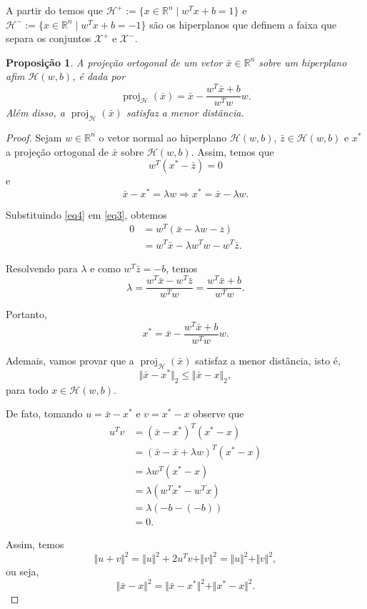 \documentclass[12pt,a4paper]{scrartcl}
\DeclareMathOperator{\proj}{proj}
\def\Xset{\mathcal{X}}
\def\Hset{\mathcal{H}}
\def\RR{\mathds{R}}
\def\xbar{\bar{x}}
\newtheorem{prop}{Proposição}
\theoremstyle{definition}%
\begin{document}
A partir do  temos que $\Hset^{+}:=\{x\in \RR^n \mid w^{T}x+b= 1\}$ e $\Hset^{-}:=\{x\in \RR^n \mid w^{T}x+b= -1\}$ são os hiperplanos que definem a faixa que separa os conjuntos $\Xset^{+}$ e $\Xset^{-}$.

\begin{prop} \label{prop1} A projeção ortogonal de um vetor $\xbar\in \RR^n$ sobre um hiperplano afim $\Hset(w,b)$, é dada por
\[ \proj_{\Hset}(\xbar)= \xbar - \dfrac{w^{T}\xbar+b}{w^{T}w}w. \]
Além disso, a $\proj_{\Hset}(\xbar)$ satisfaz a menor distância.
\end{prop}

\begin{proof}
Sejam $w\in \RR^n$ o vetor normal ao hiperplano $\Hset(w,b)$, $\bar{z}\in \Hset(w,b)$ e $x^{*}$ a projeção ortogonal de $\xbar$ sobre $\Hset(w,b)$. Assim, temos que 
\[ \label{eq3} w^{T}(x^{*}-\bar{z})=0 \]
e
\[ \label{eq4} \xbar-x^{*}=\lambda w \Longrightarrow x^{*}=\xbar-\lambda w. \]

Substituindo \eqref{eq4} em \eqref{eq3}, obtemos
\begin{align}
0 &= w^{T}(\xbar-\lambda w-\overline{z}) \\
&= w^{T}\xbar-\lambda w^{T}w - w^{T}\bar{z}.
\end{align}

Resolvendo para $\lambda$ e como $w^{T}\bar{z} = -b$, temos
\[ \lambda =\dfrac{w^{T}\xbar-w^{T}\bar{z}}{w^{T}w} =\dfrac{w^{T}\xbar+b}{w^{T}w}. \]

Portanto, 
\[ x^{*}=\xbar-\dfrac{w^{T}\xbar+b}{w^{T}w}w . \]

Ademais, vamos provar que a $\proj_{\Hset}(\xbar)$ satisfaz a menor distância, isto é,
\[ \Vert\xbar-x^{*}\Vert_{2} \leq \Vert \xbar-x\Vert_{2}, \]
para todo $x\in \Hset(w,b)$.

De fato, tomando $u=\xbar-x^{*}$ e $v=x^{*}-x$ observe que 
\begin{align}
u^{T}v&= (\xbar-x^{*})^{T}(x^{*}-x) \\
&= (\xbar-\xbar+\lambda w)^{T}(x^{*}-x) \\
&= \lambda w^{T}(x^{*}-x) \\
&= \lambda (w^{T}x^{*}-w^{T}x) \\
&= \lambda (-b-(-b)) \\
&= 0.
\end{align}

Assim, temos
\[ \Vert u+v\Vert^{2}=\Vert u\Vert^{2} + 2u^{T}v + \Vert v\Vert^{2}=\Vert u\Vert^{2} + \Vert v\Vert^{2} , \]
ou seja,
\[ \Vert \xbar-x\Vert^{2}=\Vert \xbar-x^{*}\Vert^{2} + \Vert x^{*}-x\Vert^{2}. \]

\end{proof}
\end{document}
